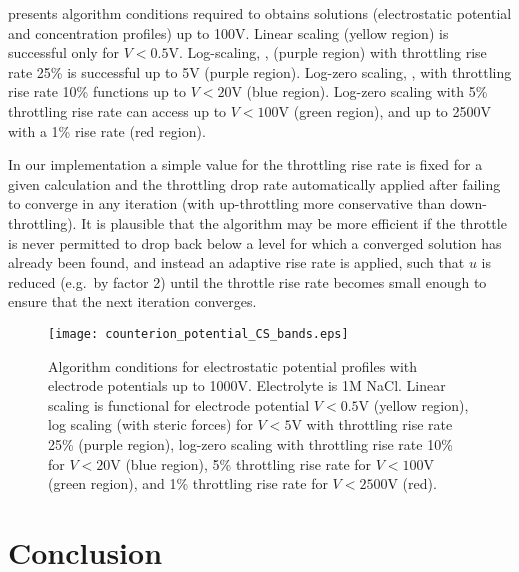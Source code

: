  presents algorithm conditions required
to obtains solutions (electrostatic potential and concentration profiles) up to
100V. Linear scaling (yellow region) is successful only for
$V<0.5$V. Log-scaling, , (purple region) with
throttling rise rate 25\% is successful up to 5V (purple
region). Log-zero scaling, , with throttling rise
rate 10\% functions up to $V<20$V (blue region). Log-zero scaling with
5\% throttling rise rate can access up to $V<100$V (green region), and
up to 2500V with a 1\% rise rate (red region).

In our  implementation a simple value for the throttling rise rate  is fixed for a given
calculation and the throttling drop rate automatically applied 
after failing to converge in any iteration
(with up-throttling more conservative than
down-throttling). It is plausible that the algorithm may be more
efficient if the throttle is never permitted to drop back below a
level for which a converged solution has already been found, and
instead an adaptive rise rate is applied, such that $u$ is reduced
(e.g.\ by factor 2) until the throttle rise rate becomes small enough to
ensure that the next iteration converges.

\begin{figure}
\centering
\texttt{[image: counterion\_potential\_CS\_bands.eps]}
\caption{\label{fig_all_potential_high} Algorithm conditions for
  electrostatic potential profiles with electrode potentials up to
  1000V. Electrolyte is 1M NaCl. Linear scaling is functional for
  electrode potential $V<0.5$V (yellow region), log scaling (with
  steric forces) for $V<5$V with throttling rise rate 25\% (purple
  region), log-zero scaling with throttling rise rate 10\% for $V<20$V
  (blue region),  5\% throttling rise rate for $V<100$V (green
  region), and 1\% throttling rise rate for $V<2500$V (red).  }
\end{figure}

\section{Conclusion}

